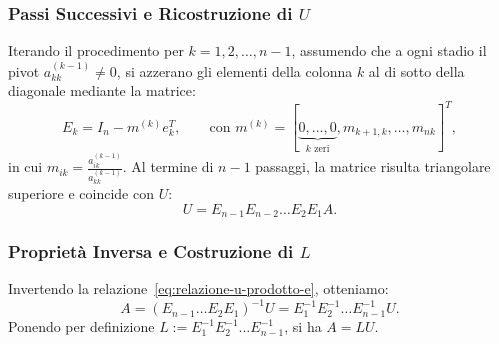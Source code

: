 \subsubsection{Passi Successivi e Ricostruzione di $U$}
Iterando il procedimento per $k = 1, 2, \dots, n-1$, assumendo che a ogni stadio il pivot $a_{kk}^{(k-1)} \neq 0$, si azzerano gli elementi della colonna $k$ al di sotto della diagonale mediante la matrice:
\begin{equation}
    E_k = I_n - m^{(k)} e_k^T, \qquad \text{con } m^{(k)} = [\underbrace{0, \dots, 0}_{k \text{ zeri}}, m_{k+1, k}, \dots, m_{nk}]^T,
\end{equation}
in cui $m_{ik} = \frac{a_{ik}^{(k-1)}}{a_{kk}^{(k-1)}}$. Al termine di $n-1$ passaggi, la matrice risulta triangolare superiore e coincide con $U$:
\begin{equation}
    U = E_{n-1} E_{n-2} \dots E_2 E_1 A.
    \label{eq:relazione-u-prodotto-e}
\end{equation}

\subsubsection{Propriet\`a Inversa e Costruzione di $L$}
Invertendo la relazione~\eqref{eq:relazione-u-prodotto-e}, otteniamo:
\begin{equation}
    A = (E_{n-1} \dots E_2 E_1)^{-1} U = E_1^{-1} E_2^{-1} \dots E_{n-1}^{-1} U.
\end{equation}
Ponendo per definizione $L := E_1^{-1} E_2^{-1} \dots E_{n-1}^{-1}$, si ha $A = LU$.

